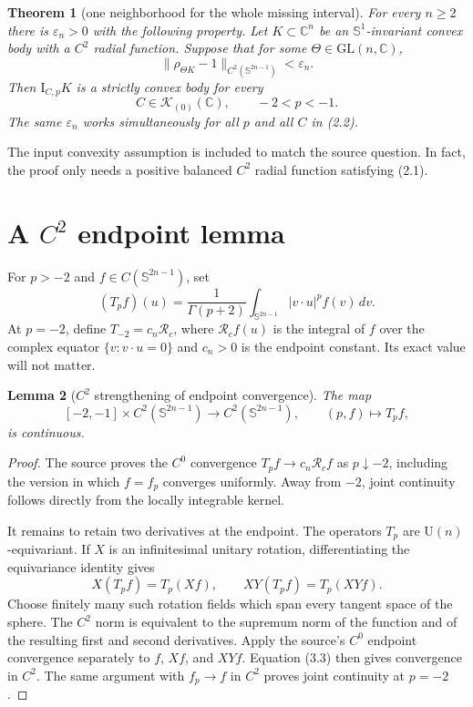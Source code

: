 \documentclass[11pt]{article}
\newtheorem{theorem}{Theorem}
\newtheorem{lemma}[theorem]{Lemma}
\newcommand{\C}{\mathbb C}
\newcommand{\Sph}{\mathbb S}
\newcommand{\Rad}{\mathcal R_c}
\newcommand{\Icp}{\mathrm I_{C,p}}
\newcommand{\GL}{\mathrm{GL}}
\newcommand{\Gam}{\Gamma}
\begin{document}
\begin{theorem}[one neighborhood for the whole missing interval]\label{thm:main}
For every $n\ge2$ there is $\varepsilon_n>0$ with the following property.
Let $K\subset\C^n$ be an $\Sph^1$-invariant convex body with a $C^2$ radial
function.  Suppose that for some $\Theta\in\GL(n,\C)$,
\[
 \bigl\|\rho_{\Theta K}-1\bigr\|_{C^2(\Sph^{2n-1})}<\varepsilon_n. \tag{2.1}
\]
Then $\Icp K$ is a strictly convex body for every
\[
 C\in\mathcal K_{(0)}(\C),\qquad -2<p<-1.                          \tag{2.2}
\]
The same $\varepsilon_n$ works simultaneously for all $p$ and all $C$ in
\textup{(2.2)}.
\end{theorem}

The input convexity assumption is included to match the source question.  In
fact, the proof only needs a positive balanced $C^2$ radial function satisfying
(2.1).

\section{A \texorpdfstring{$C^2$}{C2} endpoint lemma}

For $p>-2$ and $f\in C(\Sph^{2n-1})$, set
\[
 (T_pf)(u)=\frac1{\Gam(p+2)}
 \int_{\Sph^{2n-1}} |v\mathbin{\cdot}u|^p f(v)\,dv.                \tag{3.1}
\]
At $p=-2$, define $T_{-2}=c_n\Rad$, where $\Rad f(u)$ is the integral of
$f$ over the complex equator $\{v:v\cdot u=0\}$ and $c_n>0$ is the endpoint
constant.  Its exact value will not matter.

\begin{lemma}[$C^2$ strengthening of endpoint convergence]\label{lem:c2}
The map
\[
 [-2,-1]\times C^2(\Sph^{2n-1})\longrightarrow C^2(\Sph^{2n-1}),
 \qquad (p,f)\longmapsto T_pf,                                    \tag{3.2}
\]
is continuous.
\end{lemma}

\begin{proof}
The source proves the $C^0$ convergence $T_pf\to c_n\Rad f$ as
$p\downarrow-2$, including the version in which $f=f_p$ converges uniformly.
Away from $-2$, joint continuity follows directly from the locally integrable
kernel.

It remains to retain two derivatives at the endpoint.  The operators $T_p$
are $\mathrm U(n)$-equivariant.  If $X$ is an infinitesimal unitary rotation,
differentiating the equivariance identity gives
\[
 X(T_pf)=T_p(Xf),\qquad X Y(T_pf)=T_p(XYf).                          \tag{3.3}
\]
Choose finitely many such rotation fields which span every tangent space of
the sphere.  The $C^2$ norm is equivalent to the supremum norm of the function
and of the resulting first and second derivatives.  Apply the source's $C^0$
endpoint convergence separately to $f$, $Xf$, and $XYf$.  Equation (3.3)
then gives convergence in $C^2$.  The same argument with $f_p\to f$ in $C^2$
proves joint continuity at $p=-2$.
\end{proof}
\end{document}
